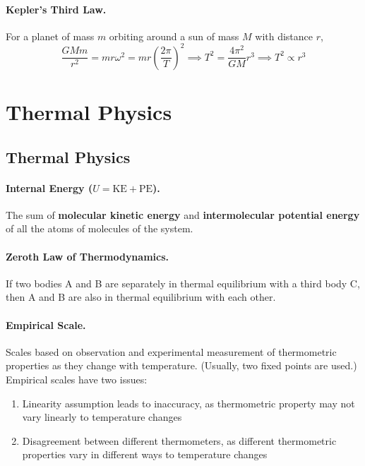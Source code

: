 \documentclass{article}
\begin{document}
\paragraph{Kepler's Third Law.} For a planet of mass $m$ orbiting around a sun of mass $M$ with distance $r$, \begin{equation}
\frac{GMm}{r^2} = mr\omega^2 = mr\left(\frac{2\pi}{T}\right)^2 \implies T^2 = \frac{4\pi^2}{GM}r^3 \implies T^2 \propto r^3
\end{equation}

\section{Thermal Physics}

\subsection{Thermal Physics}

\paragraph{Internal Energy ($U = \mathrm{KE} + \mathrm{PE}$).} The sum of \textbf{molecular kinetic energy} and \textbf{intermolecular potential energy} of all the atoms of molecules of the system.

\paragraph{Zeroth Law of Thermodynamics.} If two bodies A and B are separately in thermal equilibrium with a third body C, then A and B are also in thermal equilibrium with each other.

\paragraph{Empirical Scale.} Scales based on observation and experimental measurement of thermometric properties as they change with temperature. (Usually, two fixed points are used.) Empirical scales have two issues: \begin{enumerate}
\item Linearity assumption leads to inaccuracy, as thermometric property may not vary linearly to temperature changes
\item Disagreement between different thermometers, as different thermometric properties vary in different ways to temperature changes
\end{enumerate}
\end{document}
